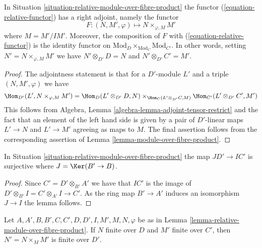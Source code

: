 \begin{lemma}
\label{lemma-relative-module-over-fibre-product}
In Situation \ref{situation-relative-module-over-fibre-product}
the functor (\ref{equation-relative-functor}) has a right adjoint, namely
the functor
$$
F : (N, M', \varphi) \longmapsto N \times_{\varphi, M} M'
$$
where $M = M'/IM'$. Moreover, the composition of $F$ with
(\ref{equation-relative-functor}) is the identity functor on
$\text{Mod}_D \times_{\text{Mod}_C} \text{Mod}_{C'}$. In other words,
setting $N' = N \times_{\varphi, M} M'$ we have
$N' \otimes_{D'} D = N$ and $N' \otimes_{D'} C' = M'$.
\end{lemma}

\begin{proof}
The adjointness statement is that for a $D'$-module $L'$ and
a triple $(N, M', \varphi)$ we have
$$
\Hom_{D'}(L', N \times_{\varphi, M} M') =
\Hom_D(L' \otimes_{D'} D, N)
\times_{\Hom_C(L' \otimes_{D'} C, M)}
\Hom_{C'}(L' \otimes_{D'} C', M')
$$
This follows from
Algebra, Lemma \ref{algebra-lemma-adjoint-tensor-restrict}
and the fact that an element of the left hand side is given by a pair
of $D'$-linear maps $L' \to N$ and $L' \to M'$ agreeing as maps to $M$.
The final assertion follows from the corresponding assertion of
Lemma \ref{lemma-module-over-fibre-product}.
\end{proof}

\begin{lemma}
\label{lemma-relative-surjection-ideals}
In Situation \ref{situation-relative-module-over-fibre-product}
the map $JD' \to IC'$ is surjective where $J = \Ker(B' \to B)$.
\end{lemma}

\begin{proof}
Since $C' = D' \otimes_{B'} A'$ we have that $IC'$ is the image
of $D' \otimes_{B'} I = C' \otimes_{A'} I \to C'$. As the ring
map $B' \to A'$ induces an isomorphism $J \to I$ the lemma follows.
\end{proof}

\begin{lemma}
\label{lemma-relative-finite-module-over-fibre-product}
Let $A, A', B, B', C, C', D, D', I, M', M, N, \varphi$ be as in
Lemma \ref{lemma-relative-module-over-fibre-product}.
If $N$ finite over $D$ and $M'$
finite over $C'$, then $N' = N \times_M M'$ is finite over $D'$.
\end{lemma}

